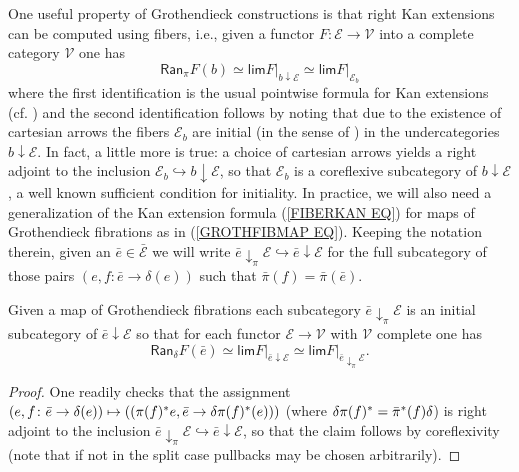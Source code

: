 \documentclass[a4paper,10pt]{article}%
\begin{document}
One useful property of Grothendieck constructions is that
right Kan extensions can be computed using fibers, i.e., 
given a functor $F \colon \mathcal{E} \to \mathcal{V}$ into a complete category $\mathcal{V}$ one has
\begin{equation}\label{FIBERKAN EQ}
	\mathsf{Ran}_{\pi}F (b)
\simeq
	\mathsf{lim} F{|_{b \downarrow \mathcal{E}}}
\simeq
	\mathsf{lim} F|_{\mathcal{E}_b}
\end{equation}
where the first identification is the usual pointwise formula for Kan extensions (cf. \cite[X.3.1]{McL})
and the second identification follows by noting that due to the existence of cartesian arrows the fibers
$\mathcal{E}_b$ are initial (in the sense of \cite[IX.3]{McL})
in the undercategories $b \downarrow \mathcal{E}$.
In fact, a little more is true: a choice of cartesian arrows 
yields a right adjoint to the inclusion
$\mathcal{E}_b \hookrightarrow b \downarrow \mathcal{E}$, so that $\mathcal{E}_b$ is a coreflexive subcategory of 
$b \downarrow \mathcal{E}$,
a well known sufficient condition for initiality.
In practice, we will also need a generalization of the Kan extension formula (\ref{FIBERKAN EQ}) for maps of Grothendieck fibrations as in (\ref{GROTHFIBMAP EQ}).
Keeping the notation therein, given an $\bar{e} \in \bar{\mathcal{E}}$ we will write 
$\bar{e} \downarrow_{\pi} \mathcal{E} \hookrightarrow
\bar{e} \downarrow \mathcal{E}$
for the full subcategory of those pairs 
$\left(e,f \colon \bar{e} \to \delta(e)\right)$
such that $\bar{\pi}(f) = \bar{\pi}(\bar{e})$.


\begin{proposition}\label{FIBERKANMAP PROP}
	Given a map of Grothendieck fibrations
	each subcategory $\bar{e} \downarrow_{\pi} \mathcal{E}$ is an initial subcategory of $\bar{e} \downarrow \mathcal{E}$
	so that for each functor 
	$\mathcal{E} \to \mathcal{V}$
	with $\mathcal{V}$ complete one has
\begin{equation}\label{FIBERKANMAP EQ}
	\mathsf{Ran}_{\delta}F (\bar{e})
\simeq
	\mathsf{lim} F{|_{\bar{e} \downarrow \mathcal{E}}}
\simeq
	\mathsf{lim} F|_{\bar{e} \downarrow_{\pi} \mathcal{E}}.
\end{equation}	
\end{proposition}

\begin{proof}
One readily checks that the assignment
$
	(e,f\colon\bar{e} \to \delta(e))
\mapsto
	\left(
	(\pi(f)^{\**}e, \bar{e} \to \delta \pi(f)^{\**}(e))
	\right)
$
(where $\delta \pi(f)^{\**} = \bar{\pi}^{\**}(f) \delta$) is  right adjoint to the inclusion
$\bar{e} \downarrow_{\pi} \mathcal{E} \hookrightarrow
\bar{e} \downarrow \mathcal{E}$, so that the claim follows by coreflexivity (note that if not in the split case pullbacks may be chosen arbitrarily).
\end{proof}
\end{document}
